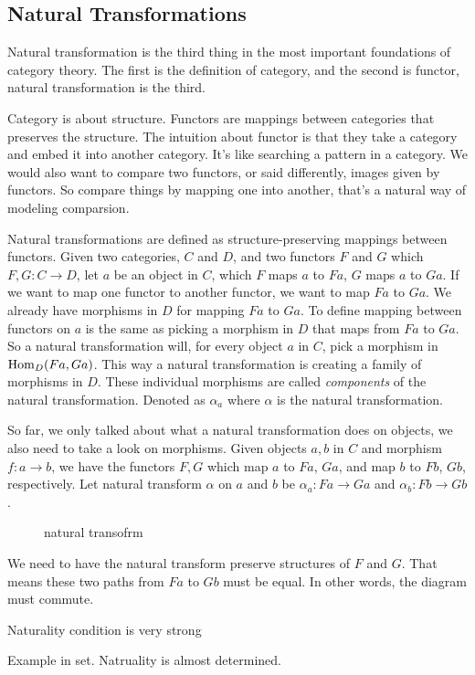 
\setcounter{section}{9}
\setcounter{subsection}{0}
\subsection{Natural Transformations}

Natural transformation is the third thing in the most important foundations of
category theory. The first is the definition of category, and the second is
functor, natural transformation is the third.

Category is about structure. Functors are mappings between categories that
preserves the structure. The intuition about functor is that they take a
category and embed it into another category. It's like searching a pattern in a
category. We would also want to compare two functors, or said differently, images
given by functors. So compare things by mapping one into another, that's a
natural way of modeling comparsion.

Natural transformations are defined as structure-preserving mappings between
functors. Given two categories, $C$ and $D$, and two functors $F$ and $G$ which
$F,G: C\to D$, let $a$ be an object in $C$, which $F$ maps $a$ to $F a$, $G$
maps $a$ to $G a$. If we want to map one functor to another functor, we want to
map $F a$ to $G a$. We already have morphisms in $D$ for mapping $F a$ to $G a$.
To define mapping between functors on $a$ is the same as picking a morphism in
$D$ that maps from $F a$ to $G a$. So a natural transformation will, for every
object $a$ in $C$, pick a morphism in $\operatorname{Hom}_D(F a, G a)$. This way a natural
transformation is creating a family of morphisms in $D$. These individual
morphisms are called \emph{components} of the natural transformation. Denoted as
$\alpha_a$ where $\alpha$ is the natural transformation.

So far, we only talked about what a natural transformation does on objects, we
also need to take a look on morphisms. Given objects $a, b$ in $C$ and morphism
$f: a \to b$, we have the functors $F, G$ which map $a$ to $F a$, $G a$, and map
$b$ to $F b$, $G b$, respectively. Let natural transform $\alpha$ on $a$ and
$b$ be $\alpha_a: F a\to G a$ and $\alpha_b: F b \to G b$.

\begin{figure}[h]
\centering
{}
\caption{natural transofrm}
\end{figure}

We need to have the natural transform preserve structures of $F$ and $G$. That
means these two paths from $F a$ to $G b$ must be equal. In other words, the
diagram must commute.

Naturality condition is very strong

Example in set. Natruality is almost determined.
